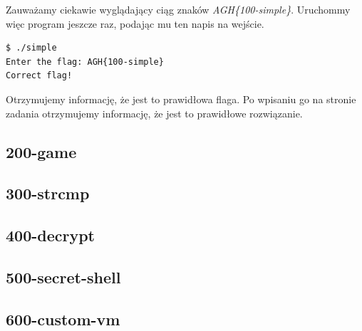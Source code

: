 \documentclass[polish,12pt]{aghthesis}
\begin{document}
Zauważamy ciekawie wyglądający ciąg znaków \emph{AGH\{100-simple\}}.
Uruchommy więc program jeszcze raz, podając mu ten napis na wejście.

\begin{verbatim}
$ ./simple
Enter the flag: AGH{100-simple}
Correct flag!
\end{verbatim}

Otrzymujemy informację, że jest to prawidłowa flaga.
Po wpisaniu go na stronie zadania otrzymujemy informację, że jest to prawidłowe rozwiązanie.

\subsection{200-game}

\subsection{300-strcmp}

\subsection{400-decrypt}

\subsection{500-secret-shell}

\subsection{600-custom-vm}

\clearpage


\end{document}
